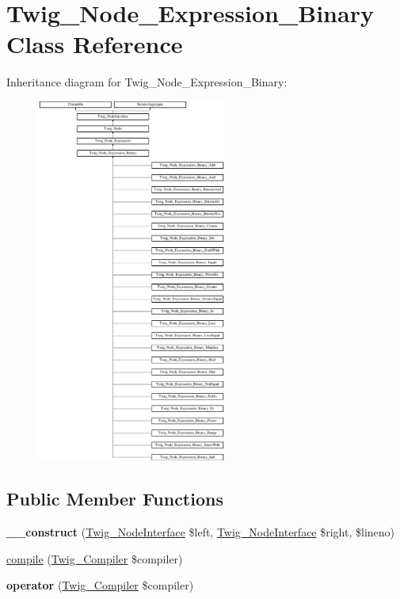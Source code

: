 \hypertarget{class_twig___node___expression___binary}{}\section{Twig\+\_\+\+Node\+\_\+\+Expression\+\_\+\+Binary Class Reference}
\label{class_twig___node___expression___binary}
Inheritance diagram for Twig\+\_\+\+Node\+\_\+\+Expression\+\_\+\+Binary\+:\begin{figure}[H]
\begin{center}
\leavevmode
\includegraphics[height=12.000000cm]{class_twig___node___expression___binary}
\end{center}
\end{figure}
\subsection*{Public Member Functions}
\begin{DoxyCompactItemize}
\item 
\hypertarget{class_twig___node___expression___binary_a188d713363d22fc94efa0d14cf6b588c}{}{\bfseries \+\_\+\+\_\+construct} (\hyperlink{interface_twig___node_interface}{Twig\+\_\+\+Node\+Interface} \$left, \hyperlink{interface_twig___node_interface}{Twig\+\_\+\+Node\+Interface} \$right, \$lineno)\label{class_twig___node___expression___binary_a188d713363d22fc94efa0d14cf6b588c}

\item 
\hyperlink{class_twig___node___expression___binary_a4e0faa87c3fae583620b84d3607085da}{compile} (\hyperlink{class_twig___compiler}{Twig\+\_\+\+Compiler} \$compiler)
\item 
\hypertarget{class_twig___node___expression___binary_af77318ec88d5f8a508684970a150b670}{}{\bfseries operator} (\hyperlink{class_twig___compiler}{Twig\+\_\+\+Compiler} \$compiler)\label{class_twig___node___expression___binary_af77318ec88d5f8a508684970a150b670}

\end{DoxyCompactItemize}
